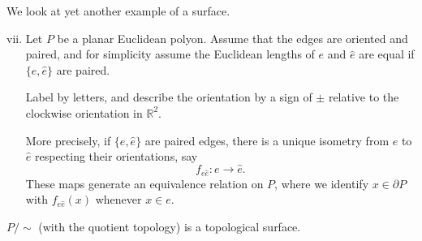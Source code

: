 \documentclass[12pt]{article}
\begin{document}
\begin{exbox}
	We look at yet another example of a surface.
	\begin{enumerate}[(i)]
		\setcounter{enumi}{6}
		\item Let $P$ be a planar Euclidean polyon. Assume that the edges are oriented and paired, and for simplicity assume the Euclidean lengths of $e$ and $\hat e$ are equal if $\{e, \hat e\}$ are paired.

			Label by letters, and describe the orientation by a sign of $\pm$ relative to the clockwise orientation in $\mathbb{R}^2$.

			More precisely, if $\{e, \hat e\}$ are paired edges, there is a unique isometry from $e$ to $\hat e$ respecting their orientations, say
			\[
			f_{e \hat e} : e \to \hat e
			.\]
			These maps generate an equivalence relation on $P$, where we identify $x \in \partial P$ with $f_{e \hat e}(x)$ whenever $x \in e$.
	\end{enumerate}
\end{exbox}

\begin{lemma}
	$P/\sim$ (with the quotient topology) is a topological surface.
\end{lemma}
\end{document}
